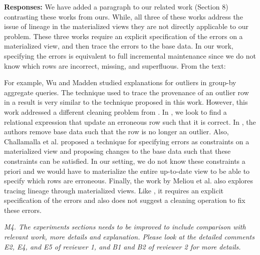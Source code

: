 \vspace{.25em}

{\bf Responses:} We have added a paragraph to our related work (Section 8) contrasting these works from ours. While, all three of these works address the issue of lineage in the materialized views they are not directly applicable to our problem. These three works require an explicit specification of the errors on a materialized view, and then trace the errors to the base data. In our work, specifying the errors is equivalent to full incremental maintenance since we do not know which rows are incorrect, missing, and superfluous. From the text:
\begin{displayquote}For example, Wu and Madden \cite{DBLP:journals/pvldb/0002M13} studied explanations for outliers in group-by aggregate queries. The technique used to trace the provenance of an outlier row in a result is very similar to the technique proposed in this work. However, this work addressed a different cleaning problem from \svc. In \svc, we look to find a relational expression that update an erroneous row such that it is correct. In \cite{DBLP:journals/pvldb/0002M13}, the authors remove base data such that the row is no longer an outlier. Also, Challamalla et al. \cite{DBLP:conf/sigmod/ChalamallaIOP14} proposed a technique for specifying errors as constraints on a materialized view and proposing changes to the base data such that these constraints can be satisfied.
In our setting, we do not know these constraints a priori and we would have to materialize the entire up-to-date view to be able to specify which rows are erroneous. Finally, the work by Meliou et al. \cite{DBLP:conf/sigmod/MeliouGNS11} also explores tracing lineage through materialized views. Like \cite{DBLP:journals/pvldb/0002M13}, it requires an explicit specification of the errors and also does not suggest a cleaning operation to fix these errors.\end{displayquote}

\vspace{1em}
\emph{M4. The experiments sections needs to be improved to include comparison with relevant work, more details and explanation. Please look at the detailed comments E2, E4, and E5 of reviewer 1, and B1 and B2 of reviewer 2 for more details. }

\vspace{.25em}

